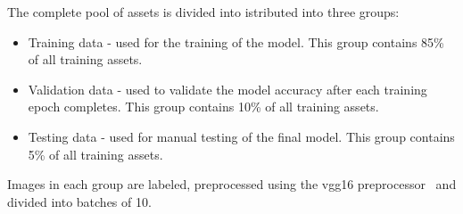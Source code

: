 \documentclass[a4paper,12pt,fleqn]{article}
\begin{document}
The complete pool of assets is divided into istributed into three groups: 
\begin{itemize}
  \item Training data - used for the training of the model. This group contains 85\% of all training assets.
  \item Validation data - used to validate the model accuracy after each training epoch completes. This group contains 10\% of all training assets.
  \item Testing data - used for manual testing of the final model. This group contains 5\% of all training assets.
\end{itemize}
Images in each group are labeled, preprocessed using the vgg16 preprocessor~\cite{brusilovsky:simonyan2014very} and divided into 
batches of 10.














\end{document}
